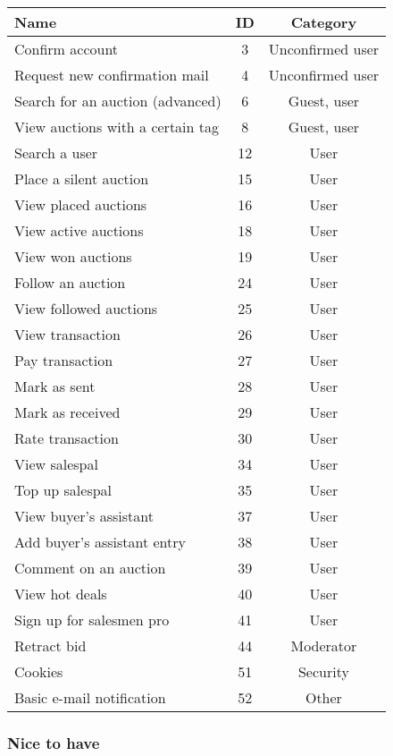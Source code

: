 	\begin{tabular}{l|c c}
	  Name & ID & Category \\ 
	  \hline
	  Confirm account & 3 & Unconfirmed user \\
	  Request new confirmation mail & 4 & Unconfirmed user \\
	  Search for an auction (advanced) & 6 & Guest, user \\
	  View auctions with a certain tag & 8 & Guest, user \\
	  Search a user & 12 & User \\
	  Place a silent auction & 15 & User \\
	  View placed auctions & 16 & User \\
	  View active auctions & 18 & User \\
	  View won auctions & 19 & User \\
	  Follow an auction & 24 & User \\
	  View followed auctions & 25 & User \\
	  View transaction & 26 & User \\
	  Pay transaction & 27 & User \\
	  Mark as sent & 28 & User \\
	  Mark as received & 29 & User \\
	  Rate transaction & 30 & User \\
	  View salespal & 34 & User \\
	  Top up salespal & 35 & User \\
	  View buyer's assistant & 37 & User \\
	  Add buyer's assistant entry & 38 & User \\
	  Comment on an auction & 39 & User \\
	  View hot deals & 40 & User \\
	  Sign up for salesmen pro & 41 & User \\
	  Retract bid & 44 & Moderator \\
	  Cookies & 51 & Security \\	  
	  Basic e-mail notification & 52 & Other	  
	\end{tabular} 
	
	\subsubsection{Nice to have}
	
